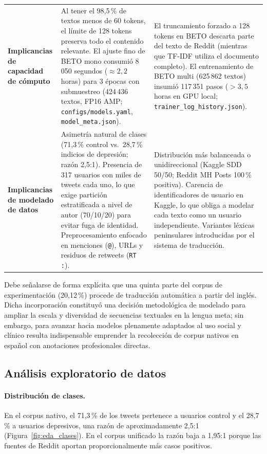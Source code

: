 \documentclass[12pt,a4paper]{article}
\begin{document}
\begin{table}[H]
\begin{tabularx}{\textwidth}{>{\raggedright\arraybackslash}p{2.8cm}>{\raggedright\arraybackslash}X>{\raggedright\arraybackslash}X}
\addlinespace
\textbf{Implicancias de capacidad de cómputo} & Al tener el 98{,}5\,\% de textos menos de 60 tokens, el límite de 128 tokens preserva todo el contenido relevante. El ajuste fino de BETO mono consumió 8\,050 segundos ($\approx 2{,}2$ horas) para 3 épocas con submuestreo (424\,436 textos, FP16 AMP; \texttt{configs/models.yaml}, \texttt{model\_meta.json}). & El truncamiento forzado a 128 tokens en BETO descarta parte del texto de Reddit (mientras que TF-IDF utiliza el documento completo). El entrenamiento de BETO multi (625\,862 textos) insumió 117\,351 pasos ($>3{,}5$ horas en GPU local; \texttt{trainer\_log\_history.json}). \\
\addlinespace
\textbf{Implicancias de modelado de datos} & Asimetría natural de clases (71{,}3\,\% control vs.\ 28{,}7\,\% indicios de depresión; razón 2{,}5:1). Presencia de 317 usuarios con miles de tweets cada uno, lo que exige partición estratificada a nivel de autor (70/10/20) para evitar fuga de identidad. Preprocesamiento enfocado en menciones (\texttt{@}), URLs y residuos de retweets (\texttt{RT :}). & Distribución más balanceada o unidireccional (Kaggle SDD 50/50; Reddit MH Posts 100\,\% positiva). Carencia de identificadores de usuario en Kaggle, lo que obliga a modelar cada texto como un usuario independiente. Variantes léxicas peninsulares introducidas por el sistema de traducción. \\
\bottomrule
\end{tabularx}
\end{table}

Debe señalarse de forma explícita que una quinta parte del corpus de experimentación (20{,}12\,\%) procede de traducción automática a partir del inglés. Dicha incorporación constituyó una decisión metodológica de modelado para ampliar la escala y diversidad de secuencias textuales en la lengua meta; sin embargo, para avanzar hacia modelos plenamente adaptados al uso social y clínico resulta indispensable emprender la recolección de corpus nativos en español con anotaciones profesionales directas.

\subsection{Análisis exploratorio de datos}
\label{sec:eda}

\paragraph{Distribución de clases.} En el corpus nativo, el 71{,}3\,\% de los tweets pertenece a usuarios control y el 28{,}7\,\% a usuarios depresivos, una razón de aproximadamente 2{,}5:1 (Figura~\ref{fig:eda_clases}). En el corpus unificado la razón baja a 1{,}95:1 porque las fuentes de Reddit aportan proporcionalmente más casos positivos.
\end{document}
